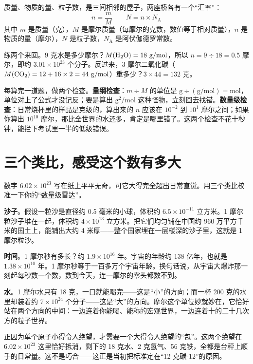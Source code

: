 \begin{qiaoliang}
质量、物质的量、粒子数，是三间相邻的屋子，两座桥各有一个“汇率”：
\[
n=\frac{m}{M}\qquad N=n\times N_{\mathrm{A}}
\]
其中 $m$ 是质量（克），$M$ 是摩尔质量（每摩尔的克数，数值等于相对质量），$n$ 是物质的量（摩尔），$N$ 是粒子数，$N_{\mathrm{A}}$ 是阿伏伽德罗常数。

练两个来回。9 克水是多少摩尔？$M(\mathrm{H_2O})=18\ \mathrm{g/mol}$，所以 $n=9\div 18=0.5$ 摩尔，即约 $3.01\times 10^{23}$ 个分子。反过来，3 摩尔二氧化碳（$M(\chem{CO_2})=12+16\times 2=44\ \mathrm{g/mol}$）重多少？$3\times 44=132$ 克。

每算完一道题，做两个检查。\textbf{量纲检查}：$m\div M$ 的单位是 $\mathrm{g}\div(\mathrm{g/mol})=\mathrm{mol}$，单位对上了公式才没记反；要是算出 $\mathrm{g^2/mol}$ 这种怪物，立刻回去找错。\textbf{数量级检查}：日常烧杯里的样品是克级的，算出来的 $n$ 应该在 $10^{-2}$ 到 $10^{1}$ 摩尔之间；如果你算出 $10^{10}$ 摩尔，那比全世界的水还多，肯定是哪里错了。这两个检查不花十秒钟，能拦下考试里一半的低级错误。
\end{qiaoliang}

\section{三个类比，感受这个数有多大}

数字 $6.02\times 10^{23}$ 写在纸上平平无奇，可它大得完全超出日常直觉。用三个类比校准一下你的“数量级雷达”。

\textbf{沙子}。假设一粒沙是直径约 0.5 毫米的小球，体积约 $6.5\times 10^{-11}$ 立方米。1 摩尔粒沙子堆在一起，体积约 $4\times 10^{13}$ 立方米。把它们均匀铺在中国约 960 万平方千米的国土上，能铺出大约 4 米厚——整个国家埋在一层楼深的沙子里，这就是 1 摩尔粒沙。

\textbf{时间}。1 摩尔秒有多长？约 $1.9\times 10^{16}$ 年。宇宙的年龄约 138 亿年，也就是 $1.38\times 10^{10}$ 年。1 摩尔秒等于一百多万个宇宙年龄。换句话说，从宇宙大爆炸那一刻起每秒数一个数，数到今天，连一摩尔的零头都数不到。

\textbf{水}。1 摩尔水只有 18 克，一口就能喝完——这是“小”的方向；而一杯 200 克的水里却装着约 $7\times 10^{24}$ 个分子——这是“大”的方向。摩尔这个单位妙就妙在，它恰好站在两个方向的中间：一边连着你能喝、能称的宏观世界，一边连着十的二十几次方的粒子世界。

正因为单个原子小得令人绝望，才需要一个大得令人绝望的“包”。这两个绝望在 $6.02\times 10^{23}$ 这里恰好抵消，剩下的 18 克水、2 克氢气、56 克铁，全都是台秤上顺手的日常量。这不是巧合——这正是当初把标准定在“12 克碳-12”的原因。

